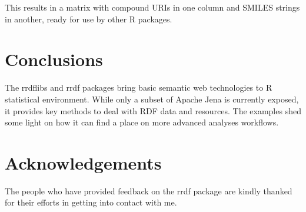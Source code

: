 \documentclass[12pt]{article}
\begin{document}
This results in a matrix with compound URIs in one column and SMILES strings in another, ready for
use by other R packages.

\section{Conclusions}

The rrdflibs and rrdf packages bring basic semantic web technologies to R statistical environment.
While only a subset of Apache Jena is currently exposed, it provides key methods to deal with
RDF data and resources. The examples shed some light on how it can find a place on more advanced
analyses workflows.

\section{Acknowledgements}

The people who have provided feedback on the rrdf package are kindly thanked for their efforts in
getting into contact with me.

\printbibliography
\end{document}
